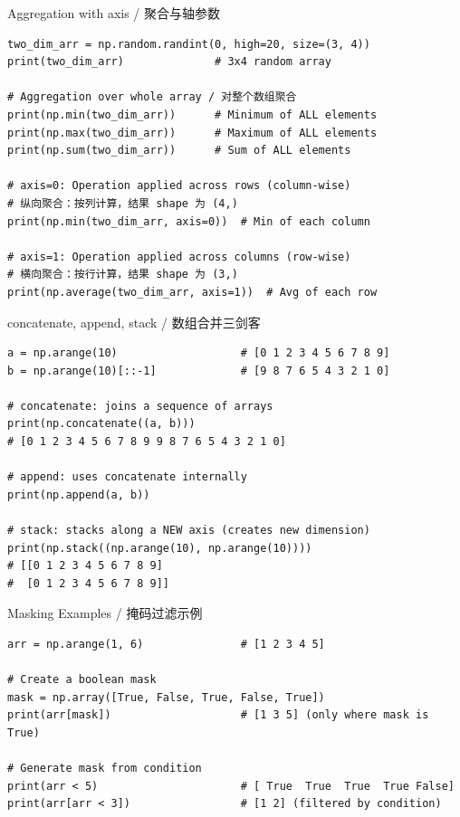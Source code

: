 \documentclass[11pt,a4paper]{report}
\begin{document}
\begin{examplebox}{Aggregation with axis / 聚合与轴参数}
\begin{lstlisting}
two_dim_arr = np.random.randint(0, high=20, size=(3, 4))
print(two_dim_arr)              # 3x4 random array

# Aggregation over whole array / 对整个数组聚合
print(np.min(two_dim_arr))      # Minimum of ALL elements
print(np.max(two_dim_arr))      # Maximum of ALL elements
print(np.sum(two_dim_arr))      # Sum of ALL elements

# axis=0: Operation applied across rows (column-wise)
# 纵向聚合：按列计算，结果 shape 为 (4,)
print(np.min(two_dim_arr, axis=0))  # Min of each column

# axis=1: Operation applied across columns (row-wise)
# 横向聚合：按行计算，结果 shape 为 (3,)
print(np.average(two_dim_arr, axis=1))  # Avg of each row
\end{lstlisting}
\end{examplebox}

\begin{examplebox}{concatenate, append, stack / 数组合并三剑客}
\begin{lstlisting}
a = np.arange(10)                   # [0 1 2 3 4 5 6 7 8 9]
b = np.arange(10)[::-1]             # [9 8 7 6 5 4 3 2 1 0]

# concatenate: joins a sequence of arrays
print(np.concatenate((a, b)))
# [0 1 2 3 4 5 6 7 8 9 9 8 7 6 5 4 3 2 1 0]

# append: uses concatenate internally
print(np.append(a, b))

# stack: stacks along a NEW axis (creates new dimension)
print(np.stack((np.arange(10), np.arange(10))))
# [[0 1 2 3 4 5 6 7 8 9]
#  [0 1 2 3 4 5 6 7 8 9]]
\end{lstlisting}
\end{examplebox}

\begin{examplebox}{Masking Examples / 掩码过滤示例}
\begin{lstlisting}
arr = np.arange(1, 6)               # [1 2 3 4 5]

# Create a boolean mask
mask = np.array([True, False, True, False, True])
print(arr[mask])                    # [1 3 5] (only where mask is True)

# Generate mask from condition
print(arr < 5)                      # [ True  True  True  True False]
print(arr[arr < 3])                 # [1 2] (filtered by condition)
\end{lstlisting}
\end{examplebox}
\end{document}
